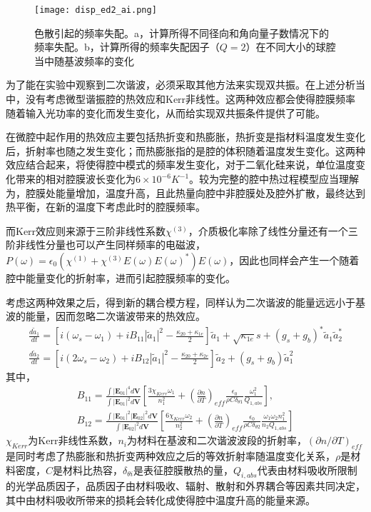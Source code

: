 \begin{figure}
\centering
\texttt{[image: disp\_ed2\_ai.png]}
\caption{ 色散引起的频率失配。a，计算所得不同径向和角向量子数情况下的频率失配。b，计算所得的频率失配因子（$Q=2$）在不同大小的球腔当中随基波频率的变化 }
\label{pic:mode}
\end{figure}

为了能在实验中观察到二次谐波，必须采取其他方法来实现双共振。在上述分析当中，没有考虑微型谐振腔的热效应和Kerr非线性。这两种效应都会使得腔膜频率随着输入光功率的变化而发生变化，从而给实现双共振条件提供了可能。

在微腔中起作用的热效应主要包括热折变和热膨胀，热折变是指材料温度发生变化后，折射率也随之发生变化；而热膨胀指的是腔的体积随着温度发生变化。这两种效应结合起来，将使得腔中模式的频率发生变化，对于二氧化硅来说，单位温度变化带来的相对腔膜波长变化为$6\times 10^{-6} K^{-1}$\cite{nikogosyan2003properties, carmon2004dynamical}。较为完整的腔中热过程模型应当理解为，腔膜处能量增加，温度升高，且此热量向腔中非腔膜处及腔外扩散\cite{ilchenko1992thermal}，最终达到热平衡，在新的温度下考虑此时的腔膜频率。

而Kerr效应则来源于三阶非线性系数$\chi^{(3)}$，介质极化率除了线性分量还有一个三阶非线性分量也可以产生同样频率的电磁波，$P(\omega) = \epsilon_0(\chi^{(1)}+\chi^{(3)}E(\omega)E(\omega)^*)E(\omega)$，因此也同样会产生一个随着腔中能量变化的折射率，进而引起腔膜频率的变化。


考虑这两种效果之后，得到新的耦合模方程，同样认为二次谐波的能量远远小于基波的能量，因而忽略二次谐波带来的热效应。
\begin{gather}
\label{eq:cpmodec}
\frac{d\tilde{a}_1}{dt} = [i(\omega_s-\omega_1)+iB_{11}|\tilde{a}_1|^2-\frac{\kappa_{20}+\kappa_{1e}}{2}]\tilde{a}_1+\sqrt{\kappa_{1e}}s+(g_s+g_b)^*\tilde{a}_1\tilde{a}_2^* \\
\frac{d\tilde{a}_2}{dt} = [i(2\omega_s-\omega_2)+iB_{12}|\tilde{a}_1|^2-\frac{\kappa_{20}+\kappa_{2e}}{2}]\tilde{a}_2+(g_s+g_b)\tilde{a}_1^2
\label{eq:cpmodec2}
\end{gather}
其中，
\begin{gather}
B_{11} = \frac{\int|\mathbf{E}_{01}|^4d\mathbf{V}}{\int|\mathbf{E}_{01}|^2d\mathbf{V}}[\frac{3\chi_{Kerr}\omega_1}{n_1^2}+(\frac{\partial n}{\partial T})_{eff}\frac{\epsilon_0}{\rho C \delta_{\theta 1}}\frac{\omega_1^2}{Q_{1,abs}}], \\
B_{12} = \frac{\int|\mathbf{E}_{01}|^2|\mathbf{E}_{02}|^2d\mathbf{V}}{\int|\mathbf{E}_{02}|^2d\mathbf{V}}[\frac{6\chi_{Kerr}\omega_2}{n_2^2}+(\frac{\partial n}{\partial T})_{eff}\frac{\epsilon_0}{\rho C \delta_{\theta 2}}\frac{\omega_1\omega_2n_1^2}{n_2Q_{1,abs}}]
\end{gather}
$\chi_{Kerr}$为Kerr非线性系数，$n_i$为材料在基波和二次谐波波段的折射率，$(\partial n/\partial T)_{eff}$是同时考虑了热膨胀和热折变两种效应之后的等效折射率随温度变化关系，$\rho$是材料密度，$C$是材料比热容，$\delta_{\theta i}$是表征腔膜散热的量\cite{fomin2005nonstationary}，$Q_{i,abs}$代表由材料吸收所限制的光学品质因子\cite{rokhsari2004loss}，品质因子由材料吸收、辐射、散射和外界耦合等因素共同决定，其中由材料吸收所带来的损耗会转化成使得腔中温度升高的能量来源。

